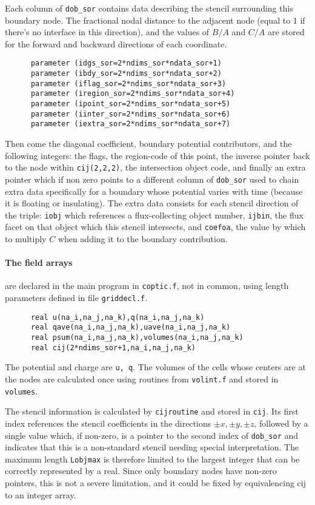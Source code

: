 \documentclass[12pt]{article}
\begin{document}
Each column of \verb!dob_sor! contains data describing the stencil
surrounding this boundary node. The fractional nodal distance to the
adjacent node (equal to 1 if there's no interface in this direction), and the
values of $B/A$ and $C/A$ are stored for the forward and backward
directions of each coordinate. 
\begin{verbatim}
      parameter (idgs_sor=2*ndims_sor*ndata_sor+1)
      parameter (ibdy_sor=2*ndims_sor*ndata_sor+2)
      parameter (iflag_sor=2*ndims_sor*ndata_sor+3)
      parameter (iregion_sor=2*ndims_sor*ndata_sor+4)
      parameter (ipoint_sor=2*ndims_sor*ndata_sor+5)
      parameter (iinter_sor=2*ndims_sor*ndata_sor+6)
      parameter (iextra_sor=2*ndims_sor*ndata_sor+7)
\end{verbatim}
Then come the diagonal coefficient, boundary potential contributors,
and the following integers: the flags, the region-code of this point,
the inverse pointer back to the node within \verb!cij(2,2,2)!, the
intersection object code, and finally an extra pointer which if non
zero points to a different column of \verb!dob_sor! used to chain
extra data specifically for a boundary whose potential varies with
time (because it is floating or insulating). The extra data consists
for each stencil direction of the triple: \verb!iobj! which references a
flux-collecting object number, \verb!ijbin!, the flux facet on that
object which this stencil intersects, and \verb!coefoa!, the value by
which to multiply $C$ when adding it to the boundary contribution.


\paragraph{The field arrays} are declared in the main program in \verb!coptic.f!,
not in common, using length parameters defined in file \verb!griddecl.f!.
\begin{verbatim}
      real u(na_i,na_j,na_k),q(na_i,na_j,na_k)
      real qave(na_i,na_j,na_k),uave(na_i,na_j,na_k)
      real psum(na_i,na_j,na_k),volumes(na_i,na_j,na_k)
      real cij(2*ndims_sor+1,na_i,na_j,na_k)
\end{verbatim}
The potential and charge are \verb!u, q!. The volumes of the cells
whose centers are at the nodes are calculated once using routines from
\verb!volint.f! and stored in \verb!volumes!. 

The stencil information is calculated by \verb!cijroutine! and stored
in \verb!cij!. Its first index references the stencil coefficients in
the directions $\pm x, \pm y, \pm z$, followed by a single value
which, if non-zero, is a pointer to the second index of \verb!dob_sor!
and indicates that this is a non-standard stencil needing special
interpretation. The maximum length \verb!Lobjmax! is therefore limited
to the largest integer that can be correctly represented by a
real. Since only boundary nodes have non-zero pointers, this is not a
severe limitation, and it could be fixed by equivalencing cij to an
integer array.
\end{document}
